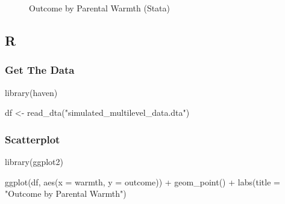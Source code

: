 \documentclass[
  letterpaper,
  DIV=11,
  numbers=noendperiod]{scrreprt}
\newenvironment{Shaded}{\begin{snugshade}}{\end{snugshade}}
\newcommand{\AttributeTok}[1]{\textcolor[rgb]{0.40,0.45,0.13}{#1}}
\newcommand{\FunctionTok}[1]{\textcolor[rgb]{0.28,0.35,0.67}{#1}}
\newcommand{\NormalTok}[1]{\textcolor[rgb]{0.00,0.23,0.31}{#1}}
\newcommand{\OtherTok}[1]{\textcolor[rgb]{0.00,0.23,0.31}{#1}}
\newcommand{\SpecialCharTok}[1]{\textcolor[rgb]{0.37,0.37,0.37}{#1}}
\newcommand{\StringTok}[1]{\textcolor[rgb]{0.13,0.47,0.30}{#1}}
\begin{document}
\begin{figure}


\caption{\label{fig-Stata}Outcome by Parental Warmth (Stata)}

\end{figure}%

\subsection{R}

\subsubsection{Get The Data}\label{get-the-data-1}

\begin{Shaded}
\begin{Highlighting}[]
\FunctionTok{library}\NormalTok{(haven)}

\NormalTok{df }\OtherTok{\textless{}{-}} \FunctionTok{read\_dta}\NormalTok{(}\StringTok{"simulated\_multilevel\_data.dta"}\NormalTok{)}
\end{Highlighting}
\end{Shaded}

\subsubsection{Scatterplot}\label{scatterplot-1}

\begin{Shaded}
\begin{Highlighting}[]
\FunctionTok{library}\NormalTok{(ggplot2)}

\FunctionTok{ggplot}\NormalTok{(df,}
       \FunctionTok{aes}\NormalTok{(}\AttributeTok{x =}\NormalTok{ warmth,}
           \AttributeTok{y =}\NormalTok{ outcome)) }\SpecialCharTok{+}
  \FunctionTok{geom\_point}\NormalTok{() }\SpecialCharTok{+}
  \FunctionTok{labs}\NormalTok{(}\AttributeTok{title =} \StringTok{"Outcome by Parental Warmth"}\NormalTok{)}
\end{Highlighting}
\end{Shaded}
\end{document}
